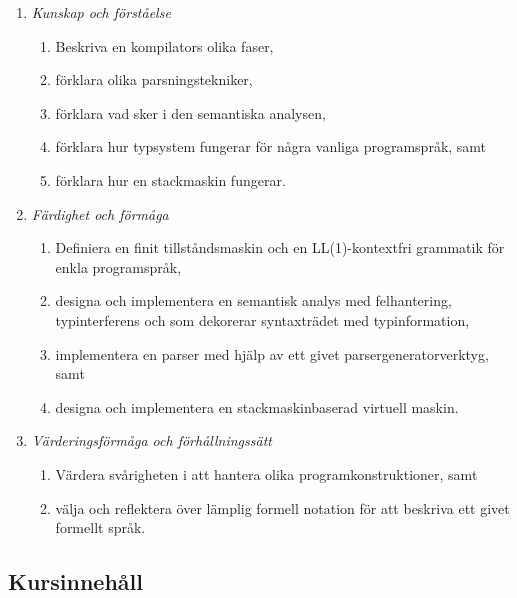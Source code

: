 \begin{enumerate}
\def\labelenumi{\Alph{enumi}.}
\tightlist
\item
  \emph{Kunskap och förståelse}

  \begin{enumerate}
  \def\labelenumii{\Alph{enumi}.\arabic{enumii}.}
  \tightlist
  \item
    Beskriva en kompilators olika faser,
  \item
    förklara olika parsningstekniker,
  \item
    förklara vad sker i den semantiska analysen,
  \item
    förklara hur typsystem fungerar för några vanliga programspråk, samt
  \item
    förklara hur en stackmaskin fungerar.
  \end{enumerate}
\item
  \emph{Färdighet och förmåga}

  \begin{enumerate}
  \def\labelenumii{\Alph{enumi}.\arabic{enumii}.}
  \tightlist
  \item
    Definiera en finit tillståndsmaskin och en LL(1)-kontextfri
    grammatik för enkla programspråk,
  \item
    designa och implementera en semantisk analys med felhantering,
    typinterferens och som dekorerar syntaxträdet med typinformation,
  \item
    implementera en parser med hjälp av ett givet
    parsergeneratorverktyg, samt
  \item
    designa och implementera en stackmaskinbaserad virtuell maskin.
  \end{enumerate}
\item
  \emph{Värderingsförmåga och förhållningssätt}

  \begin{enumerate}
  \def\labelenumii{\Alph{enumi}.\arabic{enumii}.}
  \tightlist
  \item
    Värdera svårigheten i att hantera olika programkonstruktioner, samt
  \item
    välja och reflektera över lämplig formell notation för att beskriva
    ett givet formellt språk.
  \end{enumerate}
\end{enumerate}

\subsection*{Kursinnehåll}

